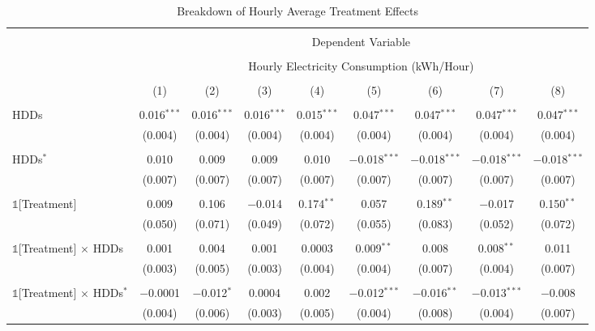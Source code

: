 
\begin{table}[!htbp] \centering 
  \caption{Breakdown of Hourly Average Treatment Effects} 
  \label{Table:Breakdown-of-Hourly-ATEs_For-Appendix} 
\small 
\begin{tabular}{@{\extracolsep{10pt}}lcccccccc} 
\\[-1.8ex]\hline 
\hline \\[-1.8ex] 
 & \multicolumn{8}{c}{Dependent Variable} \\ 
\cline{2-9} 
\\[-1.8ex] & \multicolumn{8}{c}{Hourly Electricity Consumption  (kWh/Hour)} \\ 
\\[-1.8ex] & (1) & (2) & (3) & (4) & (5) & (6) & (7) & (8)\\ 
\hline \\[-1.8ex] 
 HDDs & 0.016$^{***}$ & 0.016$^{***}$ & 0.016$^{***}$ & 0.015$^{***}$ & 0.047$^{***}$ & 0.047$^{***}$ & 0.047$^{***}$ & 0.047$^{***}$ \\ 
  & (0.004) & (0.004) & (0.004) & (0.004) & (0.004) & (0.004) & (0.004) & (0.004) \\ 
  & & & & & & & & \\ 
 HDDs$^{*}$ & 0.010 & 0.009 & 0.009 & 0.010 & $-$0.018$^{***}$ & $-$0.018$^{***}$ & $-$0.018$^{***}$ & $-$0.018$^{***}$ \\ 
  & (0.007) & (0.007) & (0.007) & (0.007) & (0.007) & (0.007) & (0.007) & (0.007) \\ 
  & & & & & & & & \\ 
 $\mathbb{1}$[Treatment] & 0.009 & 0.106 & $-$0.014 & 0.174$^{**}$ & 0.057 & 0.189$^{**}$ & $-$0.017 & 0.150$^{**}$ \\ 
  & (0.050) & (0.071) & (0.049) & (0.072) & (0.055) & (0.083) & (0.052) & (0.072) \\ 
  & & & & & & & & \\ 
 $\mathbb{1}$[Treatment] $\times$ HDDs & 0.001 & 0.004 & 0.001 & 0.0003 & 0.009$^{**}$ & 0.008 & 0.008$^{**}$ & 0.011 \\ 
  & (0.003) & (0.005) & (0.003) & (0.004) & (0.004) & (0.007) & (0.004) & (0.007) \\ 
  & & & & & & & & \\ 
 $\mathbb{1}$[Treatment] $\times$ HDDs$^{*}$ & $-$0.0001 & $-$0.012$^{*}$ & 0.0004 & 0.002 & $-$0.012$^{***}$ & $-$0.016$^{**}$ & $-$0.013$^{***}$ & $-$0.008 \\ 
  & (0.004) & (0.006) & (0.003) & (0.005) & (0.004) & (0.008) & (0.004) & (0.007) \\ 

\end{tabular}
\end{table}
